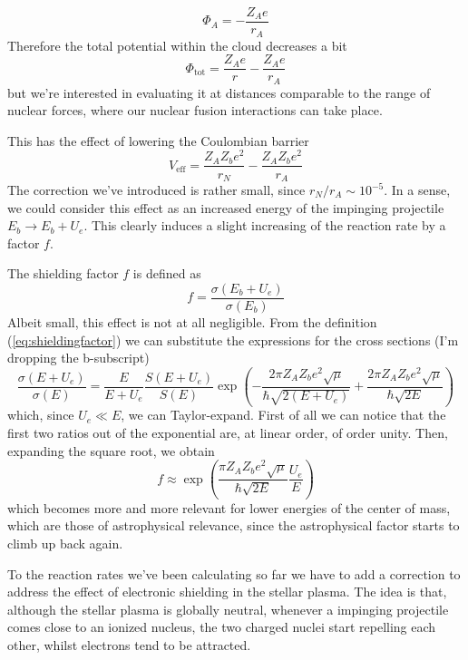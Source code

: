 \begin{equation*}
    \Phi_{A} = -\frac{Z_{A}e}{r_{A}}
\end{equation*}
Therefore the total potential within the cloud decreases a bit
\begin{equation*}
    \Phi_{\text{tot}} = \frac{Z_{A}e}{r}-\frac{Z_{A}e}{r_{A}}
\end{equation*}
but we're interested in evaluating it at distances comparable to the range of nuclear forces, where our nuclear fusion interactions can take place.
\par This has the effect of lowering the Coulombian barrier
\begin{equation*}
    V_{\text{eff}} = \frac{Z_{A}Z_{b}e^{2}}{r_{N}}-\frac{Z_{A}Z_{b}e^{2}}{r_{A}}
\end{equation*}
The correction we've introduced is rather small, since $r_{N}/r_{A}\sim 10^{-5}$. In a sense, we could consider this effect as an increased energy of the impinging projectile $E_{b}\to E_{b}+U_{e}$. This clearly induces a slight increasing of the reaction rate by a factor $f$.
\par The shielding factor $f$ is defined as 
\begin{equation}
    f = \frac{\sigma(E_{b}+U_{e})}{\sigma(E_{b})}
    \label{eq:shieldingfactor}
\end{equation}
Albeit small, this effect is not at all negligible. From the definition (\ref{eq:shieldingfactor}) we can substitute the expressions for the cross sections (I'm dropping the b-subscript)
\begin{equation*}
    \frac{\sigma(E+U_{e})}{\sigma(E)} = \frac{E}{E+U_{e}}\frac{S(E+U_{e})}{S(E)}\exp\left(-\frac{2\pi Z_{A}Z_{b}e^{2}\sqrt{\mu}}{\hbar\sqrt{2(E+U_{e})}}+\frac{2\pi Z_{A}Z_{b}e^{2}\sqrt{\mu}}{\hbar\sqrt{2E}}\right)
\end{equation*}
which, since $U_{e} \ll E$, we can Taylor-expand. First of all we can notice that the first two ratios out of the exponential are, at linear order, of order unity. Then, expanding the square root, we obtain
\begin{equation*}
    f \approx \exp\left(\frac{\pi Z_{A}Z_{b}e^{2}\sqrt{\mu}}{\hbar\sqrt{2E}}\frac{U_{e}}{E}\right)
\end{equation*}
which becomes more and more relevant for lower energies of the center of mass, which are those of astrophysical relevance, since the astrophysical factor starts to climb up back again.
\par To the reaction rates we've been calculating so far we have to add a correction to address the effect of electronic shielding in the stellar plasma. The idea is that, although the stellar plasma is globally neutral, whenever a impinging projectile comes close to an ionized nucleus, the two charged nuclei start repelling each other, whilst electrons tend to be attracted.
